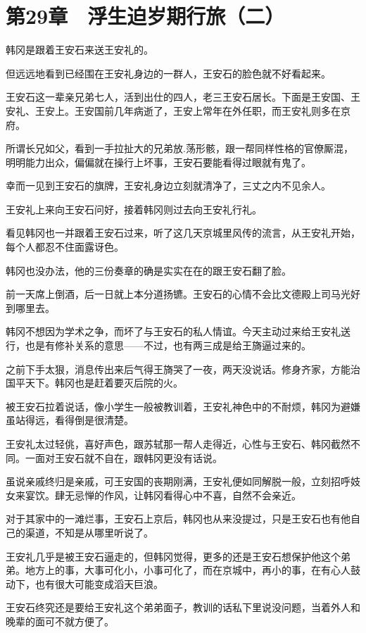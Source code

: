 \section{第29章　浮生迫岁期行旅（二）}

韩冈是跟着王安石来送王安礼的。

但远远地看到已经围在王安礼身边的一群人，王安石的脸色就不好看起来。

王安石这一辈亲兄弟七人，活到出仕的四人，老三王安石居长。下面是王安国、王安礼、王安上。王安国前几年病逝了，王安上常年在外任职，而王安礼则多在京府。

所谓长兄如父，看到一手拉扯大的兄弟放.荡形骸，跟一帮同样性格的官僚厮混，明明能力出众，偏偏就在操行上坏事，王安石要能看得过眼就有鬼了。

幸而一见到王安石的旗牌，王安礼身边立刻就清净了，三丈之内不见余人。

王安礼上来向王安石问好，接着韩冈则过去向王安礼行礼。

看见韩冈也一并跟着王安石过来，听了这几天京城里风传的流言，从王安礼开始，每个人都忍不住面露讶色。

韩冈也没办法，他的三份奏章的确是实实在在的跟王安石翻了脸。

前一天席上倒酒，后一日就上本分道扬镳。王安石的心情不会比文德殿上司马光好到哪里去。

韩冈不想因为学术之争，而坏了与王安石的私人情谊。今天主动过来给王安礼送行，也是有修补关系的意思——不过，也有两三成是给王旖逼过来的。

之前下手太狠，消息传出来后气得王旖哭了一夜，两天没说话。修身齐家，方能治国平天下。韩冈也是赶着要灭后院的火。

被王安石拉着说话，像小学生一般被教训着，王安礼神色中的不耐烦，韩冈为避嫌虽站得远，看得倒是很清楚。

王安礼太过轻佻，喜好声色，跟苏轼那一帮人走得近，心性与王安石、韩冈截然不同。一面对王安石就不自在，跟韩冈更没有话说。

虽说亲戚终归是亲戚，可王安国的丧期刚满，王安礼便如同解脱一般，立刻招呼妓女来宴饮。肆无忌惮的作风，让韩冈看得心中不喜，自然不会亲近。

对于其家中的一滩烂事，王安石上京后，韩冈也从来没提过，只是王安石也有他自己的渠道，不知是从哪里听说了。

王安礼几乎是被王安石逼走的，但韩冈觉得，更多的还是王安石想保护他这个弟弟。地方上的事，大事可化小，小事可化了，而在京城中，再小的事，在有心人鼓动下，也有很大可能变成滔天巨浪。

王安石终究还是要给王安礼这个弟弟面子，教训的话私下里说没问题，当着外人和晚辈的面可不就方便了。

